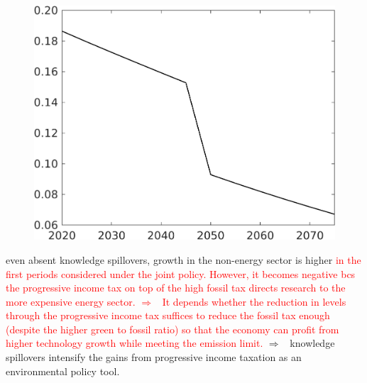 \documentclass[12pt]{article}
\newcommand{\ar}{$\Rightarrow$ \ }
\newcommand{\tr}[1]{\textcolor{red}{#1}}
\begin{document}
\begin{figure}[h!!]
\begin{minipage}[]{0.32\textwidth}
	\end{minipage}		
	\begin{minipage}[]{0.32\textwidth}
		\includegraphics[width=1\textwidth]{../../codding_model/own_basedOnFried/optimalPol_010922_revision/figures/all_13Sept22/CompTaufPER_bytaul_Reg0_EY_spillover0_nsk0_xgr0_knspil1_sep0_LFlimit1_emsbase0_countec0_GovRev0_etaa0.79_lgd0.png}
	\end{minipage}	
\end{figure}
 even absent knowledge spillovers, growth in the non-energy sector is higher \tr{in the first periods considered under the joint policy. However, it becomes negative bcs the progressive income tax on top of the high fossil tax directs research to the more expensive energy sector. \ar It depends whether the reduction in levels through the progressive income tax suffices to reduce the fossil tax enough (despite the higher green to fossil ratio) so that the economy can profit from higher technology growth while meeting the emission limit.}
 \ar knowledge spillovers intensify the gains from progressive income taxation as an environmental policy tool. 
 
\end{document}
